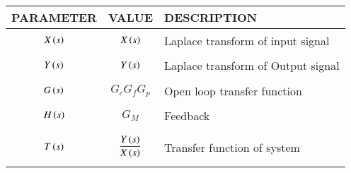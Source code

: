 \begin{tabular}{|p{2cm}|p{2cm}|p{4cm}|}
    \hline
    PARAMETER & VALUE & DESCRIPTION   \\ \hline
    $$X\left(s\right)$$ & $$X\left(s\right)$$ & Laplace transform of input signal  \\ \hline
    $$Y\left(s\right)$$ & $$Y\left(s\right)$$ & Laplace transform of Output signal  \\ \hline
    $$G\left(s\right)$$ & $$G_c G_f G_p$$ & Open loop transfer function    \\ \hline
    $$H\left(s\right)$$ & $$G_M$$ & Feedback  \\ \hline
    $$T\left(s\right)$$ & $$\frac{Y\left(s\right)}{X\left(s\right)}$$ & Transfer function of system   \\ \hline
    \end{tabular}
